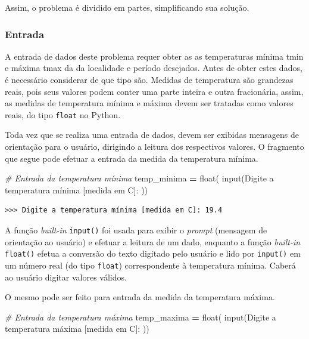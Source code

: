\documentclass[
]{book}
\newenvironment{Shaded}{\begin{snugshade}}{\end{snugshade}}
\newcommand{\BuiltInTok}[1]{#1}
\newcommand{\CommentTok}[1]{\textcolor[rgb]{0.56,0.35,0.01}{\textit{#1}}}
\newcommand{\NormalTok}[1]{#1}
\newcommand{\OperatorTok}[1]{\textcolor[rgb]{0.81,0.36,0.00}{\textbf{#1}}}
\newcommand{\StringTok}[1]{\textcolor[rgb]{0.31,0.60,0.02}{#1}}
\begin{document}
Assim, o problema é dividido em partes, simplificando sua solução.

\hypertarget{entrada}{%
\subsubsection{Entrada}\label{entrada}}

A entrada de dados deste problema requer obter as as temperaturas mínima tmin e máxima tmax da da localidade e período desejados. Antes de obter estes dados, é necessário considerar de que tipo são. Medidas de temperatura são grandezas reais, pois seus valores podem conter uma parte inteira e outra fracionária, assim, as medidas de temperatura mínima e máxima devem ser tratadas como valores reais, do tipo \texttt{float} no Python.

Toda vez que se realiza uma entrada de dados, devem ser exibidas mensagens de orientação para o usuário, dirigindo a leitura dos respectivos valores. O fragmento que segue pode efetuar a entrada da medida da temperatura mínima.

\begin{Shaded}
\begin{Highlighting}[]
\CommentTok{\# Entrada da temperatura mínima}
\NormalTok{temp\_minima }\OperatorTok{=} \BuiltInTok{float}\NormalTok{(}
    \BuiltInTok{input}\NormalTok{(}\StringTok{\textquotesingle{}Digite a temperatura mínima [medida em C]: \textquotesingle{}}\NormalTok{))}
\end{Highlighting}
\end{Shaded}

\begin{verbatim}
>>> Digite a temperatura mínima [medida em C]: 19.4
\end{verbatim}

A função \emph{built-in} \texttt{input()} foi usada para exibir o \emph{prompt} (mensagem de orientação ao usuário) e efetuar a leitura de um dado, enquanto a função \emph{built-in} \texttt{float()} efetua a conversão do texto digitado pelo usuário e lido por \texttt{input()} em um número real (do tipo \texttt{float}) correspondente à temperatura mínima. Caberá ao usuário digitar valores válidos.

O mesmo pode ser feito para entrada da medida da temperatura máxima.

\begin{Shaded}
\begin{Highlighting}[]
\CommentTok{\# Entrada da temperatura máxima}
\NormalTok{temp\_maxima }\OperatorTok{=} \BuiltInTok{float}\NormalTok{(}
    \BuiltInTok{input}\NormalTok{(}\StringTok{\textquotesingle{}Digite a temperatura máxima [medida em C]: \textquotesingle{}}\NormalTok{))}
\end{Highlighting}
\end{Shaded}
\end{document}
